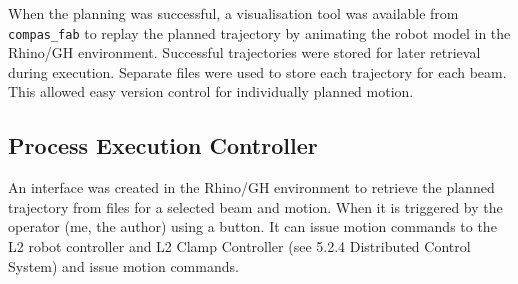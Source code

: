 When the planning was successful, a visualisation tool was available from \verb|compas_fab| to replay the planned trajectory by animating the robot model in the Rhino/GH environment. Successful trajectories were stored for later retrieval during execution. Separate files were used to store each trajectory for each beam. This allowed easy version control for individually planned motion. 

\subsection{Process Execution Controller}
\label{subsection:exploration_2_process_execution_controller}

An interface was created in the Rhino/GH environment to retrieve the planned trajectory from files for a selected beam and motion. When it is triggered by the operator (me, the author) using a button. It can issue motion commands to the L2 robot controller and L2 Clamp Controller (see 5.2.4 Distributed Control System) and issue motion commands. 
